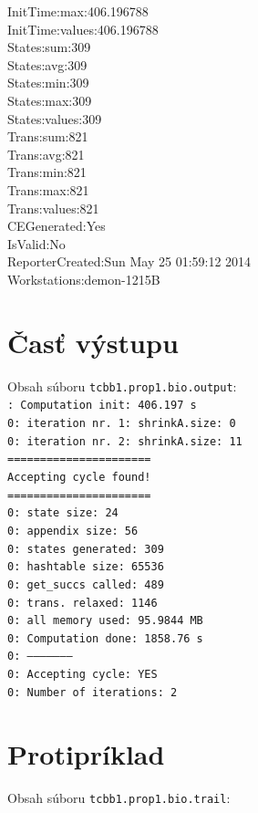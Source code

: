 \documentclass[11pt,final,oneside]{fithesis}
\begin{document}
{InitTime:max:406.196788\\
InitTime:values:406.196788\\
States:sum:309\\
States:avg:309\\
States:min:309\\
States:max:309\\
States:values:309\\
Trans:sum:821\\
Trans:avg:821\\
Trans:min:821\\
Trans:max:821\\
Trans:values:821\\
CEGenerated:Yes\\
IsValid:No\\
ReporterCreated:Sun May 25 01:59:12 2014\\
Workstations:demon-1215B\\
}

\section{\v Cas\v t v\'ystupu}
\label{sec:prop1output}
Obsah s\'uboru {\tt tcbb1.prop1.bio.output}:\\

{\tt{}: Computation init:  406.197 s\\
0: iteration nr. 1: shrinkA.size: 0\\
0: iteration nr. 2: shrinkA.size: 11\\
======================\\
Accepting cycle found!\\
======================\\
 0: state size:		24\\
 0: appendix size:	56\\
 0: states generated:	309\\
 0: hashtable size:	65536\\
 0: get\_succs called:	489\\
 0: trans. relaxed:	1146\\
 0: all memory used:	95.9844 MB\\
 0: Computation done:	1858.76 s\\
 0: --------------------\\
 0: Accepting cycle:	YES\\
 0: Number of iterations:	2\\
}

\section{Protipr\'iklad}
\label{sec:prop1trail}
Obsah s\'uboru {\tt tcbb1.prop1.bio.trail}:\\
\end{document}
